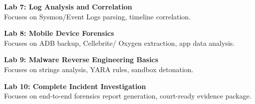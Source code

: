 \noindent\textbf{Lab 7: Log Analysis and Correlation} \\
Focuses on Sysmon/Event Logs parsing, timeline correlation.

\vspace{0.2cm}

\noindent\textbf{Lab 8: Mobile Device Forensics} \\
Focuses on ADB backup, Cellebrite/ Oxygen extraction, app data analysis.

\vspace{0.2cm}

\noindent\textbf{Lab 9: Malware Reverse Engineering Basics} \\
Focuses on strings analysis, YARA rules, sandbox detonation.

\vspace{0.2cm}

\noindent\textbf{Lab 10: Complete Incident Investigation} \\
Focuses on end-to-end forensics report generation, court-ready evidence package.

\vspace{0.2cm}

\newpage
{}
